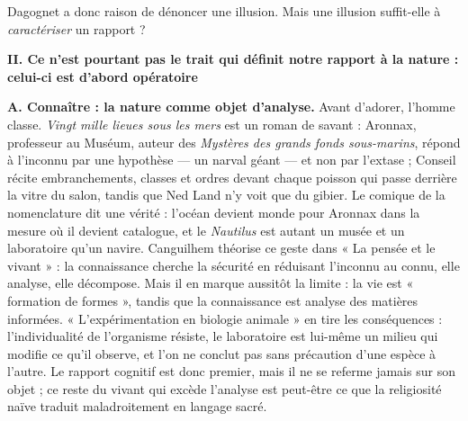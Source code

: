 \documentclass[11pt,a4paper]{article}
\begin{document}
Dagognet a donc raison de dénoncer une illusion. Mais une illusion suffit-elle à \emph{caractériser} un rapport ?

\textbf{II. Ce n'est pourtant pas le trait qui définit notre rapport à la nature : celui-ci est d'abord opératoire}

\textbf{A. Connaître : la nature comme objet d'analyse.} Avant d'adorer, l'homme classe. \emph{Vingt mille lieues sous les mers} est un roman de savant : Aronnax, professeur au Muséum, auteur des \emph{Mystères des grands fonds sous-marins}, répond à l'inconnu par une hypothèse --- un narval géant --- et non par l'extase ; Conseil récite embranchements, classes et ordres devant chaque poisson qui passe derrière la vitre du salon, tandis que Ned Land n'y voit que du gibier. Le comique de la nomenclature dit une vérité : l'océan devient monde pour Aronnax dans la mesure où il devient catalogue, et le \emph{Nautilus} est autant un musée et un laboratoire qu'un navire. Canguilhem théorise ce geste dans « La pensée et le vivant » : la connaissance cherche la sécurité en réduisant l'inconnu au connu, elle analyse, elle décompose. Mais il en marque aussitôt la limite : la vie est « formation de formes », tandis que la connaissance est analyse des matières informées. « L'expérimentation en biologie animale » en tire les conséquences : l'individualité de l'organisme résiste, le laboratoire est lui-même un milieu qui modifie ce qu'il observe, et l'on ne conclut pas sans précaution d'une espèce à l'autre. Le rapport cognitif est donc premier, mais il ne se referme jamais sur son objet ; ce reste du vivant qui excède l'analyse est peut-être ce que la religiosité naïve traduit maladroitement en langage sacré.
\end{document}
